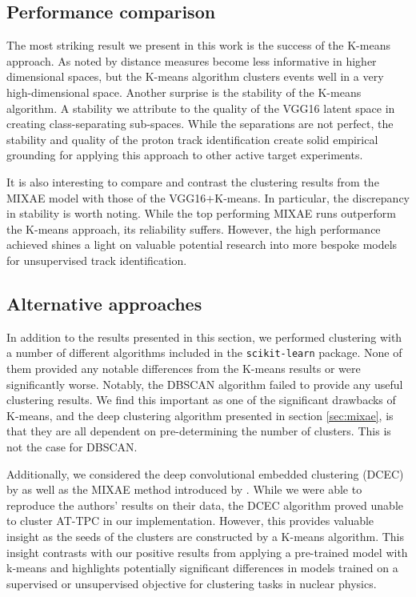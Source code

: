 \documentclass[review,number,sort&compress]{elsarticle}
\begin{document}
\subsection{Performance comparison}

The most striking result we present in this work is the success of the K-means approach. As noted by \cite{Aggarwal} distance measures become less informative in higher dimensional spaces, but the K-means algorithm clusters events well in a very high-dimensional space.
Another surprise is the stability of the K-means algorithm. A stability we attribute to the quality of the VGG16 latent space in creating class-separating sub-spaces. While the separations are not perfect, the stability and quality of the proton track identification create solid empirical grounding for applying this approach to other active target experiments. 


It is also interesting to compare and contrast the clustering results from the MIXAE model with those of the VGG16$+$K-means. In particular, the discrepancy in stability is worth noting. While the top performing MIXAE runs outperform the K-means approach, its reliability suffers. However, the high performance achieved shines a light on valuable potential research into more bespoke models for unsupervised track identification.


\subsection{Alternative approaches}

In addition to the results presented in this section, we performed clustering with a number of different algorithms included in the \lstinline{scikit-learn} package. None of them provided any notable differences from the K-means results or were significantly worse. Notably, the DBSCAN algorithm \cite{Ester96adensity-based}\cite{Bergstra2012} failed to provide any useful clustering results. We find this important as one of the significant drawbacks of K-means, and the deep clustering algorithm presented in section \ref{sec:mixae}, is that they are all dependent on pre-determining the number of clusters. This is not the case for DBSCAN. 

Additionally, we considered the deep convolutional embedded clustering (DCEC) by \citet{Guo2017} as well as the MIXAE method introduced by \citet{Zhang}. While we were able to reproduce the authors' results on their data, the DCEC algorithm proved unable to cluster AT-TPC in our implementation. However, this provides valuable insight as the seeds of the clusters are constructed by a K-means algorithm. This insight contrasts with our positive results from applying a pre-trained model with k-means and highlights potentially significant differences in models trained on a supervised or unsupervised objective for clustering tasks in nuclear physics. 
\end{document}
